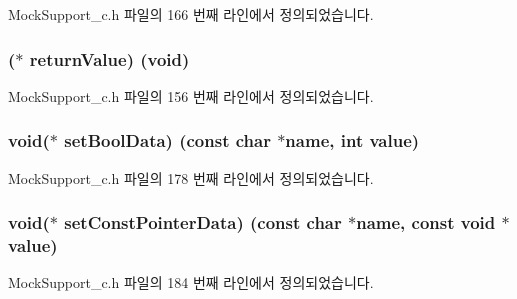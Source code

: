 Mock\+Support\+\_\+c.\+h 파일의 166 번째 라인에서 정의되었습니다.

\subsubsection[{\texorpdfstring{return\+Value}{returnValue}}]{($\ast$ return\+Value) (void)}\hypertarget{struct_s_mock_support__c_ab6bd7926fedfdf87c2a7ac71a1ff6a7c}{}\label{struct_s_mock_support__c_ab6bd7926fedfdf87c2a7ac71a1ff6a7c}


Mock\+Support\+\_\+c.\+h 파일의 156 번째 라인에서 정의되었습니다.

\subsubsection[{\texorpdfstring{set\+Bool\+Data}{setBoolData}}]{\setlength{\rightskip}{0pt plus 5cm}void($\ast$ set\+Bool\+Data) (const char $\ast$name, int value)}\hypertarget{struct_s_mock_support__c_afb17ae0d3880c203cd277457ae33c750}{}\label{struct_s_mock_support__c_afb17ae0d3880c203cd277457ae33c750}


Mock\+Support\+\_\+c.\+h 파일의 178 번째 라인에서 정의되었습니다.

\subsubsection[{\texorpdfstring{set\+Const\+Pointer\+Data}{setConstPointerData}}]{\setlength{\rightskip}{0pt plus 5cm}void($\ast$ set\+Const\+Pointer\+Data) (const char $\ast$name, const void $\ast$value)}\hypertarget{struct_s_mock_support__c_ad5e8d2980ffa18fd21bdc753218a313c}{}\label{struct_s_mock_support__c_ad5e8d2980ffa18fd21bdc753218a313c}


Mock\+Support\+\_\+c.\+h 파일의 184 번째 라인에서 정의되었습니다.

